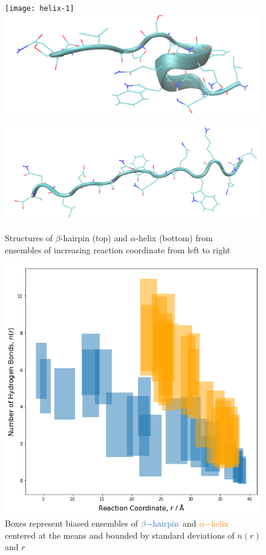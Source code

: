 \documentclass{article}[12pt]
\numberwithin{equation}{section}
\begin{document}
\begin{figure}[H]
	\texttt{[image: helix-1]}
	\includegraphics[scale=0.35]{helix-2}
	\includegraphics[scale=0.35]{helix-3}
\caption{Structures of $\beta$-hairpin (top) and $\alpha$-helix (bottom)
from\\ ensembles of increasing reaction coordinate from left to right}
\label{fig:unfold}
\end{figure}
\begin{figure}[H]
	\centering{}
	\captionsetup{justification=centering}
	\includegraphics[scale=0.5]{hydrogen}
\caption{Boxes represent biased ensembles of $\color{NavyBlue}{\beta\mathrm{-hairpin}}$ and
$\color{orange}{\alpha\mathrm{-helix}}$\\centered at the means and bounded by standard
deviations of $n(r)$ and $r$}
\label{fig:hydrogen}
\end{figure}
\end{document}
